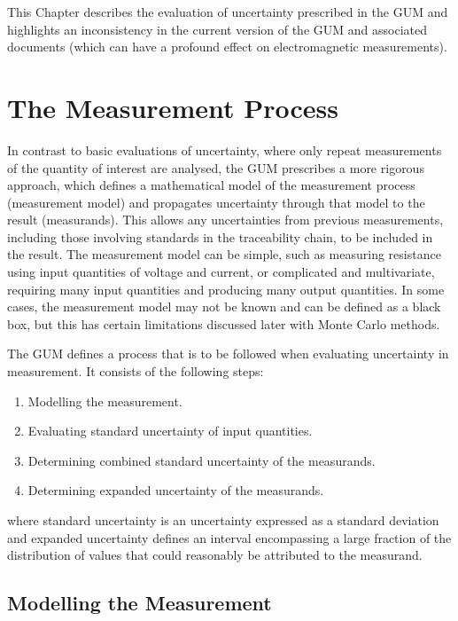 \documentclass[../thesis/thesis.tex]{subfiles}
\begin{document}
\begin{refsection}
This Chapter describes the evaluation of uncertainty prescribed in the GUM and highlights an inconsistency in the current version of the GUM and associated documents (which can have a profound effect on electromagnetic measurements).

\section{The Measurement Process}

In contrast to basic evaluations of uncertainty, where only repeat measurements of the quantity of interest are analysed, the GUM prescribes a more rigorous approach, which defines a mathematical model of the measurement process (measurement model) and propagates uncertainty through that model to the result (measurands). This allows any uncertainties from previous measurements, including those involving standards in the traceability chain, to be included in the result. The measurement model can be simple, such as measuring resistance using input quantities of voltage and current, or complicated and multivariate, requiring many input quantities and producing many output quantities. In some cases, the measurement model may not be known and can be defined as a black box, but this has certain limitations discussed later with Monte Carlo methods.

The GUM defines a process that is to be followed when evaluating uncertainty in measurement. It consists of the following steps:

\begin{enumerate}
	\item Modelling the measurement.
	\item Evaluating standard uncertainty of input quantities.
	\item Determining combined standard uncertainty of the measurands.
	\item Determining expanded uncertainty of the measurands.
\end{enumerate}

where standard uncertainty is an uncertainty expressed as a standard deviation and expanded uncertainty defines an interval encompassing a large fraction of the distribution of values that could reasonably be attributed to the measurand.

\subsection{Modelling the Measurement}


\end{refsection}
\end{document}
